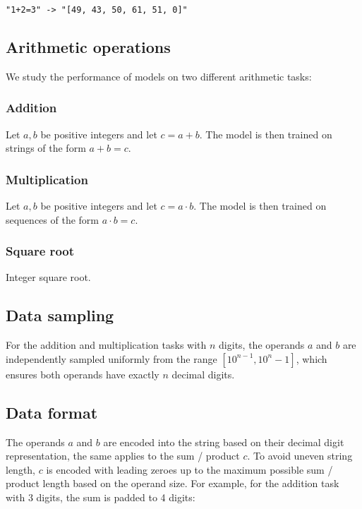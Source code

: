 \begin{verbatim}
"1+2=3" -> "[49, 43, 50, 61, 51, 0]"
\end{verbatim}

\subsection{Arithmetic operations}

We study the performance of models on two different arithmetic tasks:

\subsubsection{Addition}

Let $a, b$ be positive integers and let $c=a+b$. The model is then trained on strings of the form $a+b=c$.

\subsubsection{Multiplication}

Let $a, b$ be positive integers and let $c=a \cdot b$. The model is then trained on sequences of the form $a \cdot b=c$.

\subsubsection{Square root}

Integer square root.

\subsection{Data sampling}

For the addition and multiplication tasks with $n$ digits, the operands $a$ and $b$ are independently sampled uniformly from the range $[{10}^{n-1}, 10^n - 1]$, which ensures both operands have exactly $n$ decimal digits.

\subsection{Data format}

The operands $a$ and $b$ are encoded into the string based on their decimal digit representation, the same applies to the sum / product $c$. 
To avoid uneven string length, $c$ is encoded with leading zeroes up to the maximum possible sum / product length based on the operand size. For example, for the addition task with 3 digits, the sum is padded to 4 digits:

